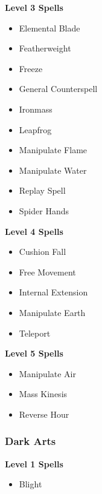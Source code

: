 \begin{multicols}{4}
\begin{itemize}[itemsep=0em]
\end{itemize}
\textbf{Level 3 Spells}
\begin{itemize}[itemsep=0em]
\renewcommand\labelitemi{-}
\item Elemental Blade

\item Featherweight

\item Freeze

\item General Counterspell

\item Ironmass

\item Leapfrog

\item Manipulate Flame

\item Manipulate Water

\item Replay Spell

\item Spider Hands


\end{itemize}
\textbf{Level 4 Spells}
\begin{itemize}[itemsep=0em]
\renewcommand\labelitemi{-}
\item Cushion Fall

\item Free Movement

\item Internal Extension

\item Manipulate Earth

\item Teleport


\end{itemize}
\textbf{Level 5 Spells}
\begin{itemize}[itemsep=0em]
\renewcommand\labelitemi{-}
\item Manipulate Air

\item Mass Kinesis

\item Reverse Hour


\end{itemize}
\vfill\null
\columnbreak\subsubsection{Dark Arts}
\textbf{Level 1 Spells}
\begin{itemize}[itemsep=0em]
\renewcommand\labelitemi{-}
\item Blight


\end{itemize}
\end{multicols}
